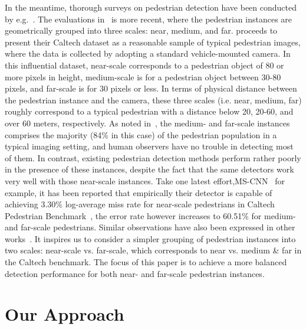 \documentclass[10pt,journal,compsoc,twoside]{IEEEtran}
\begin{document}
In the meantime, thorough surveys on pedestrian detection have been conducted by e.g.~\cite{EnzGav:tpami09,DolEtAl:tpami12}.
The evaluations in~\cite{DolEtAl:tpami12} is more recent, where the pedestrian instances are geometrically grouped into three scales: near, medium, and far. \cite{DolEtAl:tpami12} proceeds to present their Caltech dataset as a reasonable sample of typical pedestrian images, where the data is collected by adopting a standard vehicle-mounted camera. In this influential dataset, near-scale corresponds to a pedestrian object of 80 or more pixels in height, medium-scale is for a pedestrian object between 30-80 pixels, and far-scale is for 30 pixels or less. In terms of physical distance between the pedestrian instance and the camera, these three scales (i.e. near, medium, far) roughly correspond to a typical pedestrian with a distance below 20, 20-60, and over 60 meters, respectively. As noted in~\cite{DolEtAl:tpami12}, the medium- and far-scale instances comprises the majority (84\% in this case) of the pedestrian population in a typical imaging setting, and human observers have no trouble in detecting most of them. In contrast, existing pedestrian detection methods perform rather poorly in the presence of these instances, despite the fact that the same detectors work very well with those near-scale instances.
%
Take one latest effort,MS-CNN~\cite{CaiEtAl:eccv16} for example, it has been reported that empirically their detector is capable of achieving 3.30\% log-average miss rate for near-scale pedestrians in Caltech Pedestrian Benchmark~\cite{DolEtAl:cvpr09}, the error rate however increases to 60.51\% for medium- and far-scale pedestrians.
%
Similar observations have also been expressed in other works~\cite{HoiChoDai:eccv12,ZhaEtAl:cvpr16}.
It inspires us to consider a simpler grouping of pedestrian instances into two scales: near-scale vs. far-scale, which corresponds to near vs. medium \& far in the Caltech benchmark. The focus of this paper is to achieve a more balanced detection performance for both near- and far-scale pedestrian instances.





\section{Our Approach}
\label{sec:section 3}
\end{document}
